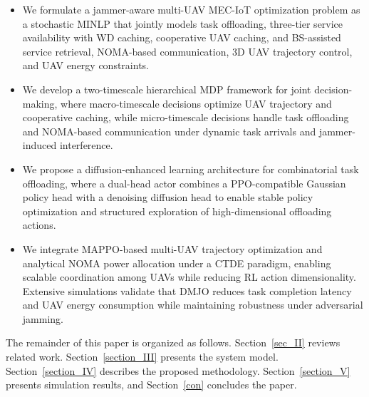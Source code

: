\documentclass[journal]{IEEEtran}
\begin{document}
\begin{itemize}

    \item We formulate a jammer-aware multi-UAV MEC-IoT optimization problem as a stochastic MINLP that jointly models task offloading, three-tier service availability with WD caching, cooperative UAV caching, and BS-assisted service retrieval, NOMA-based communication, 3D UAV trajectory control, and UAV energy constraints.

    \item We develop a two-timescale hierarchical MDP framework for joint decision-making, where macro-timescale decisions optimize UAV trajectory and cooperative caching, while micro-timescale decisions handle task offloading and NOMA-based communication under dynamic task arrivals and jammer-induced interference.

    \item We propose a diffusion-enhanced learning architecture for combinatorial task offloading, where a dual-head actor combines a PPO-compatible Gaussian policy head with a denoising diffusion head to enable stable policy optimization and structured exploration of high-dimensional offloading actions.

    \item We integrate MAPPO-based multi-UAV trajectory optimization and analytical NOMA power allocation under a CTDE paradigm, enabling scalable coordination among UAVs while reducing RL action dimensionality. Extensive simulations validate that DMJO reduces task completion latency and UAV energy consumption while maintaining robustness under adversarial jamming.

\end{itemize}

The remainder of this paper is organized as follows. 
Section~\ref{sec_II} reviews related work. 
Section~\ref{section_III} presents the system model. 
Section~\ref{section_IV} describes the proposed 
methodology. Section~\ref{section_V} presents 
simulation results, and Section~\ref{con} 
concludes the paper.


\end{document}
